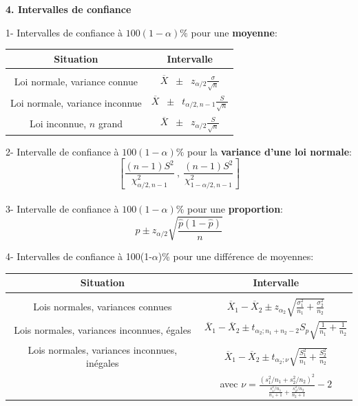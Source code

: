 \documentclass [12pt]{article}
\begin{document}
{\large {\bf 4. Intervalles de confiance} } 

1- Intervalles de confiance \`a $100(1-\alpha)\%$ pour une \textbf{moyenne}:

\begin{table}[h!]
\begin{center}
\begin{tabular}{|c||c|}
\hline
Situation & Intervalle \\[4pt]
\hline
& \\[-12pt]
Loi normale, variance connue & {\large $ \overline{X} \; \; \pm \; \; z_{\alpha/2}\frac{\sigma}{\sqrt{n}}$ }
\\[8pt]
Loi normale, variance inconnue & {\large $\overline{X} \; \; \pm \; \; t_{\alpha/2, n-1}\frac{S}{\sqrt{n}}$}
\\[8pt]
Loi inconnue, $n$ grand & {\large $\overline{X} \; \; \pm \; \; z_{\alpha/2}\frac{S}{\sqrt{n}}$ }\\[8pt]
\hline
\end{tabular}
\end{center}
\end{table}

2- Intervalle de confiance  \`a $100(1-\alpha)\%$ pour la \textbf{variance d'une loi normale}:
$$\left[ \frac{(n-1)S^2}{\chi^2_{\alpha/2, n-1}} \ , \ \frac{(n-1)S^2}{\chi^2_{1-\alpha/2, n-1}}   \right]$$\\

\vspace*{-0.4in}
3-
Intervalle de confiance \`a $100(1-\alpha)\%$ pour une \textbf{proportion}:
$$ \hat{p} \pm z_{\alpha/2} \sqrt{\frac{\hat{p}(1-\hat{p})}{n}}$$

\vspace{0.4in}

4- Intervalles de confiance à 100(1-$\alpha$)\% pour une différence de moyennes: 

\begin{table}[h!]
\begin{center}
\begin{tabular}{|c||c|}
\hline
Situation & Intervalle \\[8pt]
\hline
& \\[-12pt]
Lois normales, variances connues & {\large $ \overline{X}_1 - \overline{X}_2 \pm z_{\alpha_2} \sqrt{ \frac{\sigma^2_1}{n_1} + \frac{\sigma^2_2}{n_2}}$ }
\\[10pt]
Lois normales, variances inconnues, égales & {\large $ \overline{X}_1 - \overline{X}_2 \pm t_{\alpha_2; n_1 + n_2 - 2} S_p \sqrt{ \frac{1}{n_1} + \frac{1}{n_2}}$}
\\[10pt]
Lois normales, variances inconnues, inégales & {\large $ \overline{X}_1 - \overline{X}_2 \pm t_{\alpha_2; \nu} \sqrt{ \frac{S_1^2}{n_1} + \frac{S^2_2}{n_2}} $}\\[10pt]
&  avec {\large $\nu = \displaystyle\frac{(s_1^2/n_1 + s^2_2/n_2)^2}{ \displaystyle \frac{s_1^2/n_1}{n_1 +1} + \frac{s^2_2/n_2}{n_2 + 1} } -2 $ }\\[8pt]
\hline
\end{tabular}
\end{center}
\end{table}
\end{document}
